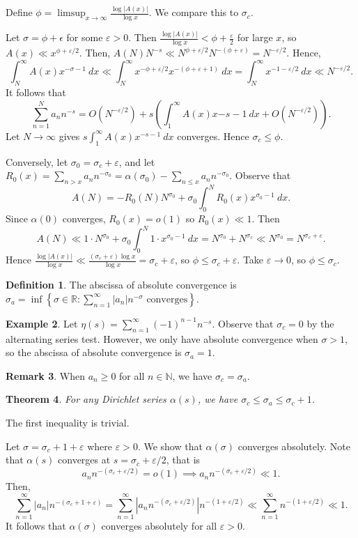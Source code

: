 \documentclass[11pt]{article}
\newtheorem{thm}{Theorem}[subsection]
\theoremstyle{definition}
\newtheorem{defn}[thm]{Definition}
\newtheorem{example}[thm]{Example}
\newtheorem{remark}[thm]{Remark}
\newcommand{\set}[1]{\left\{ #1 \right\}}
\newcommand{\s}[0]{\sigma}
\newcommand{\e}[0]{\varepsilon}
\newcommand{\abs}[1]{\left\lvert#1\right\rvert} %
\newcommand{\RR}{\mathbb{R}}
\newcommand{\NN}{\mathbb{N}}
\begin{document}
Define $\phi=\limsup_{x\to\infty}\frac{\log\abs{A(x)}}{\log x}$. We compare this to $\s_c$.

Let $\s=\phi+\epsilon$ for some $\e>0$. Then $\frac{\log\abs{A(x)}}{\log x}<\phi+\frac\e2$
for large $x$, so $A(x)\ll x^{\phi+\e/2}$. Then, $A(N)N^{-s}\ll N^{\phi+\e/2}N^{-(\phi+\e)}
= N^{-\e/2}$. Hence,
\[
  \int_N^\infty A(x)x^{-\s-1} ~dx \ll \int_N^\infty x^{-\phi+\e/2}x^{-(\phi+\e+1)} ~dx
  = \int_N^\infty x^{-1-\e/2} ~dx \ll N^{-\e/2} .
\]
It follows that
\[
  \sum_{n=1}^N a_nn^{-s}
  = O(N^{-\e/2}) + s\left(\int_1^\infty A(x)x{-s-1} ~dx + O(N^{-\e/2})\right) .
\]
Let $N\to\infty$ gives $s\int_1^\infty A(x)x^{-s-1} ~dx$ converges. Hence
$\sigma_c\le\phi$.

Conversely, let $\s_0=\s_c+\e$, and let
$R_0(x)=\sum_{n>x}a_nn^{-\s_0}=\alpha(\s_0)-\sum_{n\le x}a_nn^{-\s_0}$. Observe that
\[
  A(N) = -R_0(N)N^{\s_0} + \s_0\int_0^NR_0(x)x^{\s_0-1} ~dx .
\]
Since $\alpha(0)$ converges, $R_0(x)=o(1)$ so $R_0(x)\ll1$. Then
\[
  A(N) \ll 1 \cdot N^{\s_0} + \s_0\int_0^N 1\cdot x^{\s_0-1} ~dx
  = N^{\s_0}+N^{\s_c} \ll N^{\s_0} = N^{\s_c+\e} .
\]
Hence $\frac{\log\abs{A(x)}}{\log x} \ll \frac{(\s_c+\e)\log x}{\log x} = \s_c+\e$, so
$\phi\le\s_c+\e$. Take $\e\to0$, so $\phi\le\s_c$.
\qedhere



\begin{defn}
The abscissa of absolute convergence is
$\s_a=\inf\set{\s\in\RR:\sum_{n=1}^\infty\abs{a_n}n^{-\s}\text{ converges}}$.
\end{defn}

\begin{example}
Let $\eta(s)=\sum_{n=1}^\infty(-1)^{n-1}n^{-s}$. Observe that $\s_c=0$ by the alternating
series test. However, we only have absolute convergence when $\s>1$, so the abscissa of
absolute convergence is $\s_a=1$.
\end{example}

\begin{remark}
When $a_n\ge0$ for all $n\in\NN$, we have $\s_c=\s_a$.
\end{remark}

\begin{thm}
For any Dirichlet series $\alpha(s)$, we have $\s_c\le\s_a\le\s_c+1$.
\end{thm}
\proof
The first inequality is trivial.

Let $\s=\s_c+1+\e$ where $\e>0$. We show that $\alpha(\s)$ converges absolutely. Note that
$\alpha(s)$ converges at $s=\s_c+\e/2$, that is
\[
  a_nn^{-(\s_c+\e/2)} = o(1) \implies a_nn^{-(\s_c+\e/2)} \ll 1 .
\]
Then,
\[
  \sum_{n=1}^\infty\abs{a_n}n^{-(\s_c+1+\e)}
  = \sum_{n=1}^\infty\abs{a_nn^{-(\s_c+\e/2)}}n^{-(1+\e/2)}
  \ll \sum_{n=1}^\infty n^{-(1+\e/2)} \ll 1 .
\]
It follows that $\alpha(\s)$ converges absolutely for all $\e>0$.
\qedhere
\end{document}
